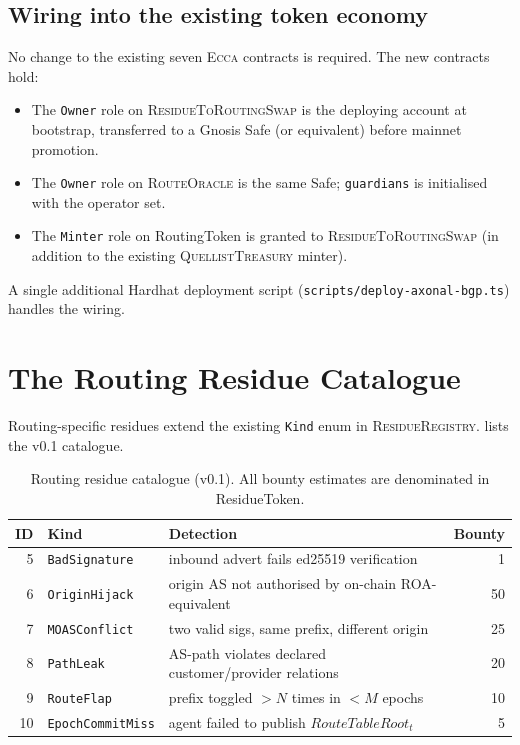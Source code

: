 \documentclass[11pt,twocolumn]{article}
\theoremstyle{definition}
\theoremstyle{plain}
\theoremstyle{remark}
\newcommand{\ecca}{\textsc{Ecca}}
\newcommand{\contractname}[1]{\textsc{#1}}
\newcommand{\code}[1]{\texttt{#1}}
\begin{document}
\subsection{Wiring into the existing token economy}

No change to the existing seven \ecca{} contracts is required. The new contracts hold:
\begin{itemize}[leftmargin=*,itemsep=2pt]
  \item The \code{Owner} role on \contractname{ResidueToRoutingSwap} is the deploying account at bootstrap, transferred to a Gnosis Safe (or equivalent) before mainnet promotion.
  \item The \code{Owner} role on \contractname{RouteOracle} is the same Safe; \code{guardians} is initialised with the operator set.
  \item The \code{Minter} role on RoutingToken is granted to \contractname{ResidueToRoutingSwap} (in addition to the existing \contractname{QuellistTreasury} minter).
\end{itemize}

\noindent A single additional Hardhat deployment script (\code{scripts/deploy-axonal-bgp.ts}) handles the wiring.

\section{The Routing Residue Catalogue}\label{sec:residues}

Routing-specific residues extend the existing \code{Kind} enum in \contractname{ResidueRegistry}.  lists the v0.1 catalogue.

\begin{table}[H]
\centering
\caption{Routing residue catalogue (v0.1). All bounty estimates are denominated in ResidueToken.}
\label{tab:residues}
\small
\begin{tabular}{@{}rlp{3.6cm}r@{}}
\toprule
\textbf{ID} & \textbf{Kind} & \textbf{Detection} & \textbf{Bounty} \\
\midrule
5  & \code{BadSignature}     & inbound advert fails ed25519 verification              & 1  \\
6  & \code{OriginHijack}     & origin AS not authorised by on-chain ROA-equivalent    & 50 \\
7  & \code{MOASConflict}     & two valid sigs, same prefix, different origin          & 25 \\
8  & \code{PathLeak}         & AS-path violates declared customer/provider relations  & 20 \\
9  & \code{RouteFlap}        & prefix toggled $>N$ times in $<M$ epochs               & 10 \\
10 & \code{EpochCommitMiss}  & agent failed to publish $\mathit{RouteTableRoot}_t$    & 5  \\
\bottomrule
\end{tabular}
\end{table}
\end{document}
